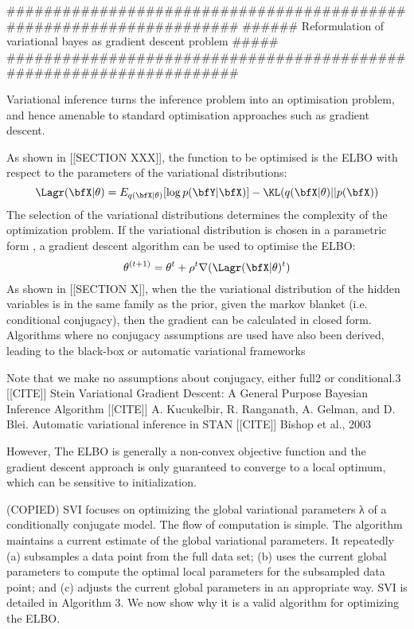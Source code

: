 

	


####################################################################
###### Reformulation of variational bayes as gradient descent problem #####
####################################################################

Variational inference turns the inference problem into an optimisation problem, and hence amenable to standard optimisation approaches such as gradient descent.

As shown in [[SECTION XXX]], the function to be optimised is the ELBO with respect to the parameters of the variational distributions:
\[
\Lagr(\bfX|\theta) = E_{q(\bfX|\theta)}[\log p(\bfY|\bfX)] - \KL(q(\bfX|\theta)||p(\bfX))	
\]
The selection of the variational distributions determines the complexity of the optimization problem. If the variational distribution is chosen in a parametric form \cite{}, a gradient descent algorithm can be used to optimise the ELBO:
\[
\theta^{(t+1)} = \theta^{t} + \rho^{t} \nabla (\Lagr(\bfX|\theta)^{t})
\]
As shown in [[SECTION X]], when the the variational distribution of the hidden variables is in the same family as the prior, given the markov blanket (i.e. conditional conjugacy), then the gradient can be calculated in closed form. Algorithms where no conjugacy assumptions are used have also been derived, leading to the black-box or automatic variational frameworks \cite{}

Note that we make no assumptions about conjugacy, either full2 or conditional.3
	[[CITE]] Stein Variational Gradient Descent: A General Purpose Bayesian Inference Algorithm
	[[CITE]] A. Kucukelbir, R. Ranganath, A. Gelman, and D. Blei. Automatic variational inference in STAN
	[[CITE]] Bishop et al., 2003

However, The ELBO is generally a non-convex objective function and the gradient descent approach is only guaranteed to converge to a local optimum, which can be sensitive to initialization.








(COPIED) SVI focuses on optimizing the global variational parameters λ of a conditionally conjugate model. The flow of computation is simple. The algorithm maintains a current estimate of the global variational parameters. It repeatedly (a) subsamples a data point from the full data set; (b) uses the current global parameters to compute the optimal local parameters for the subsampled data point; and (c) adjusts the current global parameters in an appropriate way. SVI is detailed in Algorithm 3. We now show why it is a valid algorithm for optimizing the ELBO.



